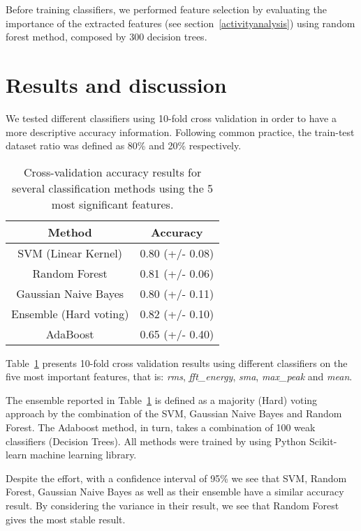 Before training classifiers, we performed feature selection by evaluating the importance of the extracted features (see section~\ref{activityanalysis}) using random forest method, composed by 300 decision trees.%

\section{Results and discussion}\label{discussion}

We tested different classifiers using 10-fold cross validation in order to have a more descriptive accuracy information. Following common practice, the train-test dataset ratio was defined as 80\% and 20\% respectively.

\begin{table}[h]\footnotesize
  \centering
  \caption{Cross-validation accuracy results for several classification methods using the 5 most significant features.%
  }
  \begin{tabular}{| c | c |}
    \hline
  	   \textbf{Method}          & \textbf{Accuracy}\\\hline
       SVM (Linear Kernel)      & 0.80 (+/- 0.08)  \\\hline
       Random Forest            & 0.81 (+/- 0.06)  \\\hline
       Gaussian Naive Bayes     & 0.80 (+/- 0.11)  \\\hline
       Ensemble (Hard voting)   & 0.82 (+/- 0.10)  \\\hline
       AdaBoost                 & 0.65 (+/- 0.40)   \\\hline
  \end{tabular}
  \label{accuracy5best}
\end{table}


Table~\ref{accuracy5best} presents 10-fold cross validation results using different classifiers on the five most important features, that is: \textit{rms}, \textit{fft\_energy}, \textit{sma}, \textit{max\_peak} and \textit{mean}. 

The ensemble reported in Table~\ref{accuracy5best} is defined as a majority (Hard) voting approach by the combination of the SVM, Gaussian Naive Bayes and Random Forest. The Adaboost method, in turn, takes a combination of 100 weak classifiers (Decision Trees). All methods were trained by using Python Scikit-learn machine learning library.

Despite the effort, with a confidence interval of 95\% we see that SVM, Random Forest, Gaussian Naive Bayes as well as their ensemble have a similar accuracy result. By considering the variance in their result, we see that Random Forest gives the most stable result. 


